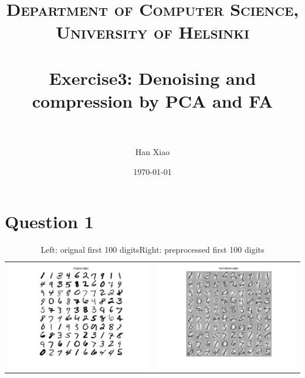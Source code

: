 \documentclass[paper=a4, fontsize=11pt]{scrartcl} %
\title{
\normalfont \normalsize
\textsc{Department of Computer Science, University of Helsinki} \\ [25pt] %
\horrule{0.5pt} \\[0.4cm] %
\huge Exercise3: Denoising and compression by PCA and FA \\ %
\horrule{2pt} \\[0.5cm] %
}
\author{Han Xiao} %
\date{\normalsize\today} %
\numberwithin{equation}{section} %
\numberwithin{figure}{section} %
\numberwithin{table}{section} %
\begin{document}
\maketitle %


\section{Question 1}

\begin{table}[H]
\caption{Left: orignal first 100 digits\newline Right: preprocessed first 100 digits}
\centering
\begin{tabular}{cc}
  \includegraphics[scale=.4]{original_digits} &
  \includegraphics[scale=.4]{normalized_digits}
\end {tabular}
\end {table}
\end{document}
